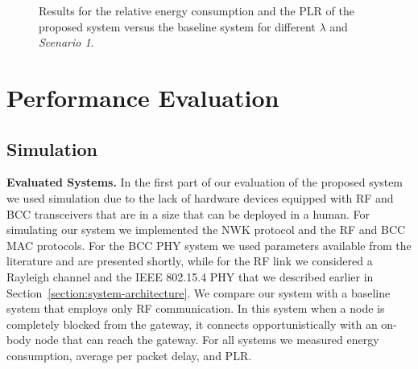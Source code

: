 \documentclass[10pt]{IEEEtran}
\newcounter{section:outage-analysis}
\begin{document}
\begin{figure}[t]
\begin{center}
\caption{Results for the relative energy consumption and the PLR of the proposed system versus the baseline system for different $\lambda$ and \emph{Scenario 1}.}
  \label{fig:energy-vs-load}
\end{center}
\end{figure}

\section{Performance Evaluation}
\label{section:experiments}
\subsection{Simulation}
\textbf{Evaluated Systems.} In the first part of our evaluation of the proposed system we used simulation due to the lack of hardware devices equipped with RF and BCC transceivers that are in a size that can be deployed in a human. For simulating our system we implemented the NWK protocol and the RF and BCC MAC protocols. For the BCC PHY system we used parameters available from the literature and are presented shortly, while for the RF link we considered a Rayleigh channel and the IEEE 802.15.4 PHY that we described earlier in Section~\ref{section:system-architecture}. We compare our system with a baseline system that employs only RF communication. In this system when a node is completely blocked from the gateway, it connects opportunistically with an on-body node that can reach the gateway. For all systems we measured energy consumption, average per packet delay, and PLR.
\end{document}

